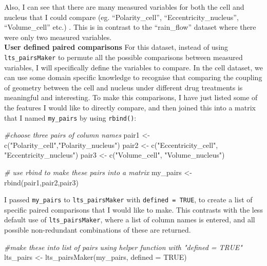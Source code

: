 \documentclass[
]{article}
\newenvironment{Shaded}{\begin{snugshade}}{\end{snugshade}}
\newcommand{\AttributeTok}[1]{\textcolor[rgb]{0.77,0.63,0.00}{#1}}
\newcommand{\CommentTok}[1]{\textcolor[rgb]{0.56,0.35,0.01}{\textit{#1}}}
\newcommand{\ConstantTok}[1]{\textcolor[rgb]{0.00,0.00,0.00}{#1}}
\newcommand{\FunctionTok}[1]{\textcolor[rgb]{0.00,0.00,0.00}{#1}}
\newcommand{\NormalTok}[1]{#1}
\newcommand{\OtherTok}[1]{\textcolor[rgb]{0.56,0.35,0.01}{#1}}
\newcommand{\StringTok}[1]{\textcolor[rgb]{0.31,0.60,0.02}{#1}}
\begin{document}
Also, I can see that there are many measured variables for both the cell
and nucleus that I could compare (eg. ``Polarity\_cell'',
``Eccentricity\_nucleus'', ``Volume\_cell'' etc.) . This is in contrast
to the ``rain\_flow'' dataset where there were only two measured
variables.\\

\textbf{User defined paired comparisons} For this dataset, instead of
using \texttt{lts\_pairsMaker} to permute all the possible comparisons
between measured variables, I will specifically define the variables to
compare. In the cell dataset, we can use some domain specific knowledge
to recognise that comparing the coupling of geometry between the cell
and nucleus under different drug treatments is meaningful and
interesting. To make this comparisons, I have just listed some of the
features I would like to directly compare, and then joined this into a
matrix that I named \texttt{my\_pairs} by using \texttt{rbind()}:

\begin{Shaded}
\begin{Highlighting}[]
\CommentTok{\#choose three pairs of column names}
\NormalTok{pair1 }\OtherTok{\textless{}{-}} \FunctionTok{c}\NormalTok{(}\StringTok{"Polarity\_cell"}\NormalTok{,}\StringTok{"Polarity\_nucleus"}\NormalTok{)}
\NormalTok{pair2 }\OtherTok{\textless{}{-}} \FunctionTok{c}\NormalTok{(}\StringTok{"Eccentricity\_cell"}\NormalTok{, }\StringTok{"Eccentricity\_nucleus"}\NormalTok{)}
\NormalTok{pair3 }\OtherTok{\textless{}{-}} \FunctionTok{c}\NormalTok{(}\StringTok{"Volume\_cell"}\NormalTok{, }\StringTok{"Volume\_nucleus"}\NormalTok{)}

\CommentTok{\# use rbind to make these pairs into a matrix}
\NormalTok{my\_pairs }\OtherTok{\textless{}{-}} \FunctionTok{rbind}\NormalTok{(pair1,pair2,pair3)}
\end{Highlighting}
\end{Shaded}

I passed \texttt{my\_pairs} to \texttt{lts\_pairsMaker} with
\texttt{defined\ =\ TRUE}, to create a list of specific paired
comparisons that I would like to make. This contrasts with the less
default use of \texttt{lts\_pairsMaker}, where a list of column names is
entered, and all possible non-redundant combinations of these are
returned.

\begin{Shaded}
\begin{Highlighting}[]
\CommentTok{\#make these into list of pairs using helper function with "defined = TRUE"}
\NormalTok{lts\_pairs }\OtherTok{\textless{}{-}} \FunctionTok{lts\_pairsMaker}\NormalTok{(my\_pairs, }\AttributeTok{defined =} \ConstantTok{TRUE}\NormalTok{)}
\end{Highlighting}
\end{Shaded}
\end{document}
